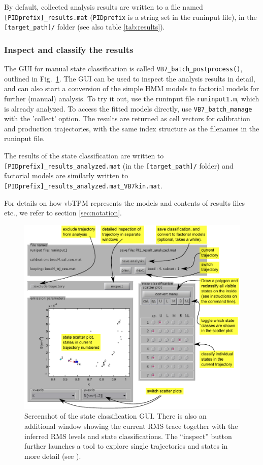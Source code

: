 By default, collected analysis results are written to a file named
\texttt{[PIDprefix]\_results.mat} (\texttt{PIDprefix} is a string set
in the runinput file), in the \texttt{[target\_path]/} folder (see
also table \ref{tab:results}).

\subsubsection*{Inspect and classify the results} 
The GUI for manual state classification is called
\verb+VB7_batch_postprocess()+, outlined in
Fig.~\ref{fig:postprocess}. The GUI can be used to inspect the
analysis results in detail, and can also start a conversion of the
simple HMM models to factorial models for further (manual)
analysis. To try it out, use the runinput file \verb+runinput1.m+,
which is already analyzed. To access the fitted models directly, use
\verb+VB7_batch_manage+ with the 'collect' option. The results are
returned as cell vectors for calibration and production trajectories,
with the same index structure as the filenames in the runinput file.

The results of the state classification are written to
\texttt{[PIDprefix]\_results\_analyzed.mat} (in the
\texttt{[target\_path]/} folder) and factorial models are similarly
written to \texttt{[PIDprefix]\_results\_analyzed.mat\_VB7kin.mat}.

For details on how vbTPM represents the models and contents of results
files etc., we refer to section \ref{sec:notation}.

\begin{figure}
  \begin{center}
    \includegraphics{figures/GUI_manual.pdf}    
  \end{center}
  \caption{Screenshot of the state classification GUI. There is also
    an additional window showing the current RMS trace together with
    the inferred RMS levels and state classifications. The ``inspect''
    button further launches a tool to explore single trajectories and
    states in more detail (see ).}\label{fig:postprocess}
\end{figure}

